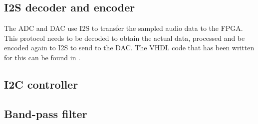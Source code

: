 \subsection{I2S decoder and encoder}
The ADC and DAC use I2S to transfer the sampled audio data to the FPGA. This protocol needs to be decoded to obtain the actual data, processed and be encoded again to I2S to send to the DAC. The VHDL code that has been written for this can be found in . 

\subsection{I2C controller}


\subsection{Band-pass filter}

